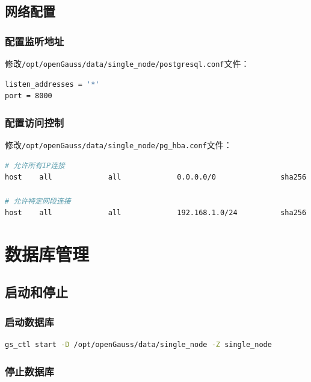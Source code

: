 \documentclass[12pt,UTF8]{ctexbook}
\begin{document}
\section{网络配置}

\subsection{配置监听地址}

修改\texttt{/opt/openGauss/data/single\_node/postgresql.conf}文件：

\begin{lstlisting}[language=bash, caption=配置监听地址]
listen_addresses = '*'
port = 8000
\end{lstlisting}

\subsection{配置访问控制}

修改\texttt{/opt/openGauss/data/single\_node/pg\_hba.conf}文件：

\begin{lstlisting}[language=bash, caption=配置访问控制规则]
# 允许所有IP连接
host    all             all             0.0.0.0/0               sha256

# 允许特定网段连接
host    all             all             192.168.1.0/24          sha256
\end{lstlisting}

\chapter{数据库管理}

\section{启动和停止}

\subsection{启动数据库}

\begin{lstlisting}[language=bash, caption=启动数据库]
gs_ctl start -D /opt/openGauss/data/single_node -Z single_node
\end{lstlisting}

\subsection{停止数据库}
\end{document}
